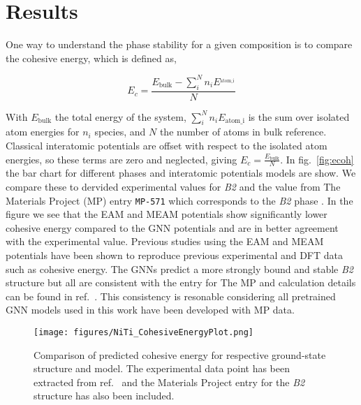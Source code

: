 \documentclass[preprint,colorlinks=true,linkcolor=black,citecolor=black]{elsarticle}
\begin{document}
\section{Results}
\label{sec:results}

One way to understand the phase stability for a given composition is
to compare the cohesive energy, which is defined as,

\begin{equation}
  \label{eq:cohesive_energy}
  E_{c} = \frac{E_{\text{bulk}}-\sum_i^N n_i E^_{\text{atom_i}}}{N}
\end{equation}

With $E_{\text{bulk}}$ the total energy of the system,
$\sum_i^N n_i E_{\text{atom_i}}$ is the sum over isolated atom
energies for $n_i$ species, and $N$ the number of atoms in bulk
reference. Classical interatomic potentials are offset with respect to
the isolated atom energies, so these terms are zero and neglected,
giving $E_{c} = \frac{E_{\text{bulk}}}{N}$. In fig.~\ref{fig:ecoh} the
bar chart for different phases and interatomic potentials models are
show. We compare these to dervided experimental values for
\textit{B2}\cite{Vandermause2024} and the value from The Materials
Project (MP) entry \texttt{MP-571} which corresponds to the
\textit{B2} phase \cite{MP--571}. In the figure we see that the EAM
and MEAM potentials show significantly lower cohesive energy compared
to the GNN potentials and are in better agreement with the
experimental value. Previous studies using the EAM and MEAM potentials
have been shown to reproduce previous experimental and DFT data
\cite{Haskins2016,Ko2015} such as cohesive energy. The GNNs predict a
more strongly bound and stable \textit{B2} structure but all are
consistent with the entry for The MP and calculation details can be
found in ref.~\cite{MP--571}. This consistency is resonable
considering all pretrained GNN models used in this work have been
developed with MP data. \par

\begin{figure}[ht!]
  \begin{centering}
    \texttt{[image: figures/NiTi\_CohesiveEnergyPlot.png]}
    \caption{ Comparison of predicted  cohesive energy for
      respective ground-state structure and model. The experimental
      data point has been extracted from ref.~\cite{Vandermause2024}
      and the Materials Project entry for the  \textit{B2}
      structure \cite{MP--571} has also been included.  }
    \label{fig:ecoh_niti}
  \end{centering}
\end{figure}
\end{document}
